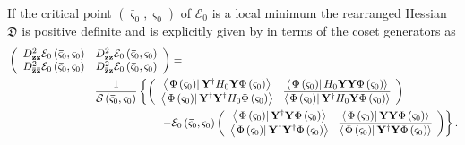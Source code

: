 \documentclass[aps,preprint]{revtex4}%
\begin{document}
If the critical point $\left(  \mathbf{\bar{\varsigma}}_{0},\mathbf{\varsigma
}_{0}\right)  $ of $\mathcal{E}_{0}$ is a local minimum the rearranged Hessian
$\mathfrak{D}$ is positive definite and is explicitly given by in terms of the
coset generators as%
\begin{align}
&  \left(
\begin{array}
[c]{cc}%
D_{\mathbf{z\bar{z}}}^{2}\mathcal{E}_{0}\left(  \mathbf{\bar{\varsigma}}%
_{0},\mathbf{\varsigma}_{0}\right)  & D_{\mathbf{zz}}^{2}\mathcal{E}%
_{0}\left(  \mathbf{\bar{\varsigma}}_{0},\mathbf{\varsigma}_{0}\right) \\
D_{\mathbf{\bar{z}\bar{z}}}^{2}\mathcal{E}_{0}\left(  \mathbf{\bar{\varsigma}%
}_{0},\mathbf{\varsigma}_{0}\right)  & D_{\mathbf{\bar{z}z}}^{2}%
\mathcal{E}_{0}\left(  \mathbf{\bar{\varsigma}}_{0},\mathbf{\varsigma}%
_{0}\right)
\end{array}
\right)  =\nonumber\\
&  \qquad\qquad\qquad\qquad\frac{1}{\mathcal{S}\left(  \mathbf{\bar{\varsigma
}}_{0},\mathbf{\varsigma}_{0}\right)  }\left\{  \left(
\begin{array}
[c]{cc}%
\left\langle \left.  \Phi\left(  \mathbf{\varsigma}_{0}\right)  \right\vert
\mathbf{Y}^{\dagger}H_{0}\mathbf{Y}\Phi\left(  \mathbf{\varsigma}_{0}\right)
\right\rangle  & \left\langle \left.  \Phi\left(  \mathbf{\varsigma}%
_{0}\right)  \right\vert H_{0}\mathbf{YY}\Phi\left(  \mathbf{\varsigma}%
_{0}\right)  \right\rangle \\
\left\langle \left.  \Phi\left(  \mathbf{\varsigma}_{0}\right)  \right\vert
\mathbf{Y^{\dagger}Y^{\dagger}}H_{0}\Phi\left(  \mathbf{\varsigma}_{0}\right)
\right\rangle  & \overline{\left\langle \left.  \Phi\left(  \mathbf{\varsigma
}_{0}\right)  \right\vert \mathbf{Y}^{\dagger}H_{0}\mathbf{Y}\Phi\left(
\mathbf{\varsigma}_{0}\right)  \right\rangle }%
\end{array}
\right)  \right. \nonumber\\
&  \qquad\qquad\qquad\qquad\qquad\qquad\qquad\left.  -\mathcal{E}_{0}\left(
\mathbf{\bar{\varsigma}}_{0},\mathbf{\varsigma}_{0}\right)  \left(
\begin{array}
[c]{cc}%
\left\langle \left.  \Phi\left(  \mathbf{\varsigma}_{0}\right)  \right\vert
\mathbf{Y}^{\dagger}\mathbf{Y}\Phi\left(  \mathbf{\varsigma}_{0}\right)
\right\rangle  & \left\langle \left.  \Phi\left(  \mathbf{\varsigma}%
_{0}\right)  \right\vert \mathbf{YY}\Phi\left(  \mathbf{\varsigma}_{0}\right)
\right\rangle \\
\left\langle \left.  \Phi\left(  \mathbf{\varsigma}_{0}\right)  \right\vert
\mathbf{Y^{\dagger}Y^{\dagger}}\Phi\left(  \mathbf{\varsigma}_{0}\right)
\right\rangle  & \overline{\left\langle \left.  \Phi\left(  \mathbf{\varsigma
}_{0}\right)  \right\vert \mathbf{Y^{\dagger}Y}\Phi\left(  \mathbf{\varsigma
}_{0}\right)  \right\rangle }%
\end{array}
\right)  \right\}  .
\end{align}
\end{document}
